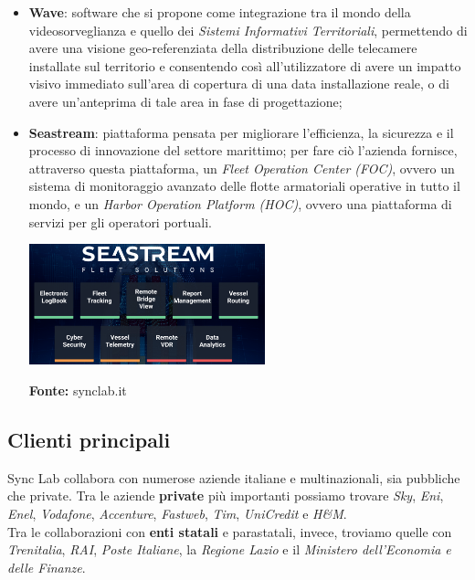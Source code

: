 \begin{itemize}
  \item \textbf{Wave}: software che si propone come integrazione tra il mondo della videosorveglianza e quello dei \textit{Sistemi Informativi Territoriali}, permettendo di avere una visione geo-referenziata della distribuzione delle telecamere installate sul territorio e consentendo così all'utilizzatore di avere un impatto visivo immediato sull'area di copertura di una data installazione reale, o di avere un'anteprima di tale area in fase di progettazione;

  \item \textbf{Seastream}: piattaforma pensata per migliorare l'efficienza, la sicurezza e il processo di innovazione del settore marittimo; per fare ciò l'azienda fornisce, attraverso questa piattaforma, un \textit{Fleet Operation Center (FOC)}, ovvero un sistema di monitoraggio avanzato delle flotte armatoriali operative in tutto il mondo, e un \textit{Harbor Operation Platform (HOC)}, ovvero una piattaforma di servizi per gli operatori portuali. \\

  \begin{minipage}{\linewidth}
    \centering
      \includegraphics[height=3.5cm]{immagini/seastream}
    \caption*{\textbf{Fonte:} synclab.it}
  \end{minipage}

\end{itemize}

\subsection*{Clienti principali}
Sync Lab collabora con numerose aziende italiane e multinazionali, sia pubbliche che private. Tra le aziende \textbf{private} più importanti possiamo trovare \textit{Sky}, \textit{Eni}, \textit{Enel}, \textit{Vodafone}, \textit{Accenture}, \textit{Fastweb}, \textit{Tim}, \textit{UniCredit} e \textit{H\&M}. \\
Tra le collaborazioni con \textbf{enti statali} e parastatali, invece, troviamo quelle con \textit{Trenitalia}, \textit{RAI}, \textit{Poste Italiane}, la \textit{Regione Lazio} e il \textit{Ministero dell'Economia e delle Finanze}.

